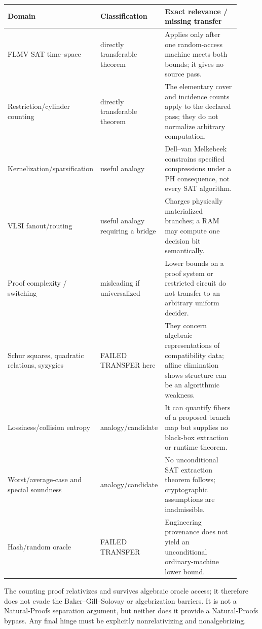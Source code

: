 \documentclass[11pt]{article}
\begin{document}
\begin{center}\small
\begin{tabular}{p{0.29\linewidth}p{0.19\linewidth}p{0.43\linewidth}}
\toprule
Domain & Classification & Exact relevance / missing transfer\\
\midrule
FLMV SAT time--space & directly transferable theorem & Applies only after one random-access machine meets both bounds; it gives no source pass.\\
Restriction/cylinder counting & directly transferable theorem & The elementary cover and incidence counts apply to the declared pass; they do not normalize arbitrary computation.\\
Kernelization/sparsification & useful analogy & Dell--van Melkebeek constrains specified compressions under a PH consequence, not every SAT algorithm.\\
VLSI fanout/routing & useful analogy requiring a bridge & Charges physically materialized branches; a RAM may compute one decision bit semantically.\\
Proof complexity / switching & misleading if universalized & Lower bounds on a proof system or restricted circuit do not transfer to an arbitrary uniform decider.\\
Schur squares, quadratic relations, syzygies & FAILED TRANSFER here & They concern algebraic representations of compatibility data; affine elimination shows structure can be an algorithmic weakness.\\
Lossiness/collision entropy & analogy/candidate & It can quantify fibers of a proposed branch map but supplies no black-box extraction or runtime theorem.\\
Worst/average-case and special soundness & analogy/candidate & No unconditional SAT extraction theorem follows; cryptographic assumptions are inadmissible.\\
Hash/random oracle & FAILED TRANSFER & Engineering provenance does not yield an unconditional ordinary-machine lower bound.\\
\bottomrule
\end{tabular}
\end{center}

The counting proof relativizes and survives algebraic oracle access; it
therefore does not evade the Baker--Gill--Solovay or algebrization barriers.
It is not a Natural-Proofs separation argument, but neither does it provide a
Natural-Proofs bypass.  Any final hinge must be explicitly nonrelativizing
and nonalgebrizing.
\end{document}
